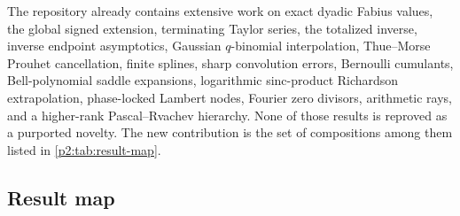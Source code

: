 \documentclass[11pt,oneside]{article}
\numberwithin{equation}{section}
\theoremstyle{definition}
\theoremstyle{remark}
\begin{document}
\begin{statusbox}
The repository already contains extensive work on exact dyadic Fabius values, the global signed
extension, terminating Taylor series, the totalized inverse, inverse endpoint asymptotics, Gaussian
$q$-binomial interpolation, Thue--Morse Prouhet cancellation, finite splines, sharp convolution
errors, Bernoulli cumulants, Bell-polynomial saddle expansions, logarithmic sinc-product
Richardson extrapolation, phase-locked Lambert nodes, Fourier zero divisors, arithmetic rays, and a
higher-rank Pascal--Rvachev hierarchy.  None of those results is reproved as a purported novelty.
The new contribution is the set of compositions among them listed in \cref{p2:tab:result-map}.
\end{statusbox}

\subsection{Result map}
\end{document}
